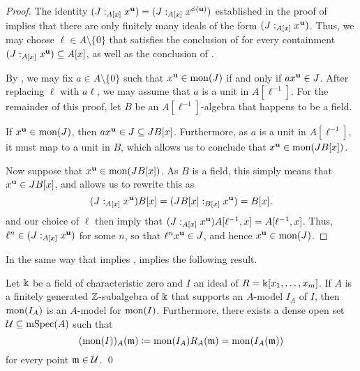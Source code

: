 \documentclass{amsart}
\begin{document}
\begin{proof}
   The identity $(J:_{A[x]} x^{\mathbf{u}}) = (J:_{A[x]} x^{\phi(\mathbf{u})})$ established in the proof of  implies that there are only finitely many ideals of the form $(J:_{A[x]} x^{\mathbf{u}})$.
   Thus, we may choose $\ell \in A\setminus \{0\}$ that satisfies the conclusion of  for every containment $(J:_{A[x]} x^{\mathbf{u}}) \subseteq A[x]$, as well as the conclusion of .

   By , we may fix $a \in A \setminus \{0\}$ such that $x^{\mathbf{u}} \in \operatorname{mon}(J)$ if and only if $ax^{\mathbf{u}} \in J$.
   After replacing $\ell$ with $a \ell$, we may assume that $a$ is a unit in $A[\ell^{-1}]$.
   For the remainder of this proof, let $B$ be an $A[\ell^{-1}]$-algebra that happens to be a field.

   If $x^{\mathbf{u}} \in \operatorname{mon}(J)$, then $a x^{\mathbf{u}} \in J \subseteq JB[x]$.  Furthermore, as $a$ is a unit in $A[\ell^{-1}]$, it must map to a unit in $B$, which allows us to conclude that $x^{\mathbf{u}} \in \operatorname{mon}(JB[x])$.   %

   Now suppose that $x^{\mathbf{u}} \in \operatorname{mon}(JB[x])$.  As $B$ is a field, this simply means that $x^{\mathbf{u}} \in JB[x]$, and   allows us to rewrite this as
   \[(J:_{A[x]} x^{\mathbf{u}}) B[x] = (JB[x] :_{B[x]} x^{\mathbf{u}}) = B[x].\]
    and our choice of $\ell$ then imply that $(J:_{A[x]} x^{\mathbf{u}}) A[\ell^{-1},x] = A[\ell^{-1},x]$.
   Thus, $\ell^n \in (J:_{A[x]} x^{\mathbf{u}})$ for some $n$, so that $\ell^n x^{\mathbf{u}} \in J$, and hence $x^{\mathbf{u}} \in \operatorname{mon}(J)$.
\end{proof}

In the same way that  implies ,  implies the following result.

\begin{theorem}
\label{mon-operation-modulo-p: T}
Let $\Bbbk$ be a field of characteristic zero and $I$ an ideal of $R=\Bbbk[x_1, \ldots, x_{m}]$.
If $A$ is a finitely generated $\mathbb{Z}$-subalgebra of $\Bbbk$ that supports an $A$-model $I_A$ of $I$, then $\operatorname{mon}(I_A)$ is an $A$-model for $\operatorname{mon}(I)$.  Furthermore, there exists a dense open set $\mathcal{U} \subseteq \operatorname{mSpec}(A)$ such that
\[ (\operatorname{mon}(I))_A(\mathfrak{m}) \coloneqq \operatorname{mon}(I_A) R_A(\mathfrak{m}) = \operatorname{mon}(I_A(\mathfrak{m})) \] for every point $\mathfrak{m} \in \mathcal{U}$. \qed
\end{theorem}
\end{document}
